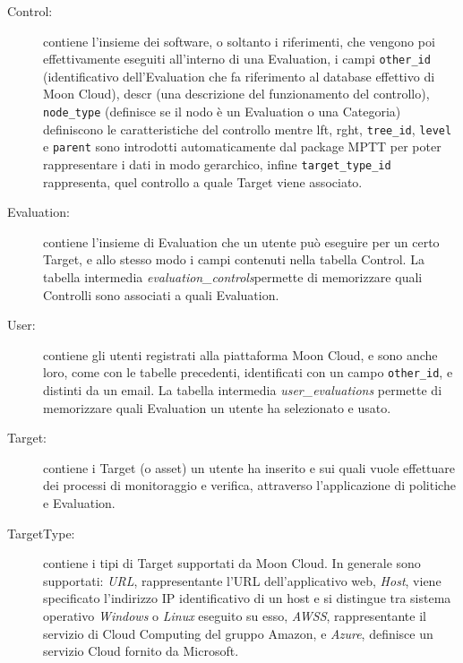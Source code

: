 \begin{description}
    \item[Control:] contiene l'insieme dei software, o soltanto i riferimenti, che vengono poi effettivamente eseguiti all'interno 
    di una Evaluation, i campi \texttt{other\_id} (identificativo dell'Evaluation che fa riferimento al database effettivo di Moon Cloud), 
    descr (una descrizione del funzionamento del controllo), \texttt{node\_type} (definisce se il nodo è un Evaluation o una Categoria) 
    definiscono le caratteristiche del controllo mentre lft, rght, \texttt{tree\_id}, \texttt{level} e \texttt{parent} sono introdotti 
    automaticamente dal package MPTT per poter rappresentare i dati in modo gerarchico, infine \texttt{target\_type\_id} rappresenta, quel 
    controllo a quale Target viene associato.
    \item[Evaluation:] contiene l'insieme di Evaluation che un utente può eseguire per un certo Target, e allo stesso modo 
    i campi contenuti nella tabella Control. La tabella intermedia \textit{evaluation\_controls}permette di memorizzare quali Controlli 
    sono associati a quali Evaluation.
    \item[User:] contiene gli utenti registrati alla piattaforma Moon Cloud, e sono anche loro, come con le tabelle precedenti, 
    identificati con un campo \texttt{other\_id}, e distinti da un email. La tabella intermedia \textit{user\_evaluations} permette di memorizzare 
    quali Evaluation un utente ha selezionato e usato.
    \item[Target:] contiene i Target (o asset) un utente ha inserito e sui quali vuole effettuare dei processi 
    di monitoraggio e verifica, attraverso l'applicazione di politiche e Evaluation.
    \item[TargetType:] contiene i tipi di Target supportati da Moon Cloud. In generale sono supportati: \textit{URL}, 
    rappresentante l'URL dell'applicativo web, \textit{Host}, viene specificato l'indirizzo IP identificativo di un host e si distingue 
    tra sistema operativo \textit{Windows} o \textit{Linux} eseguito su esso, \textit{AWSS}, rappresentante il servizio di Cloud Computing del 
    gruppo Amazon, e \textit{Azure}, definisce un servizio Cloud fornito da Microsoft.
\end{description}
%
